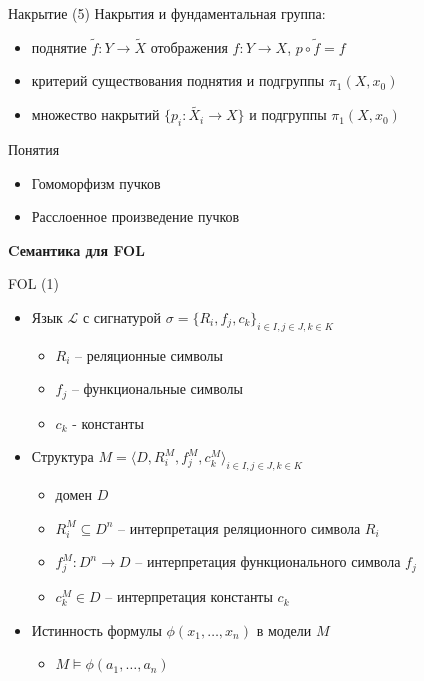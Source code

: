 \documentclass{beamer}
\begin{document}
\begin{frame}{Накрытие (5)}
Накрытия и фундаментальная группа:\\
\medskip
\begin{itemize}
	\item поднятие $\widetilde{f} : Y \to \widetilde{X}$ отображения $f : Y \to X$, $p \circ \widetilde{f} = f$ 
	\item критерий существования поднятия и подгруппы $\pi_1(X, x_0)$
	\item множество накрытий $\{ p_i : \widetilde{X_i} \to X \}$ и подгруппы $\pi_1(X, x_0)$
\end{itemize}
\end{frame}

\begin{frame}{Понятия}
\begin{itemize}
	\item Гомоморфизм пучков 
	\item Расслоенное произведение пучков
\end{itemize}
\end{frame}


\begin{frame}{}
\begin{center}
	\textbf{Cемантика для FOL}
\end{center}
\end{frame}

\begin{frame}{FOL (1)}
\begin{itemize}
	\item Язык $\mathcal{L}$ с сигнатурой $\sigma = \{ R_i, f_j, c_k \}_{i \in I, j \in J, k \in K}$
		\medskip
		\begin{itemize}
			\item $R_i$ -- реляционные символы
			\item $f_j$ -- функциональные символы
			\item $c_k$ - константы
		\end{itemize}
	\bigskip
	\item Структура $M = \langle D, R_i^M, f_j^M, c_k^M \rangle_{i \in I, j \in J, k \in K}$
		\medskip
		\begin{itemize}
			\item домен $D$ 
			\item $R_i^M \subseteq D^n$ -- интерпретация реляционного символа $R_i$
			\item $f_j^M : D^n \to D$ -- интерпретация функционального символа $f_j$
			\item $c_k^M \in D$ -- интерпретация константы $c_k$
		\end{itemize}
	\bigskip
	\item Истинность формулы $\phi(x_1, \dots, x_n)$ в модели $M$
		\medskip
		\begin{itemize}
			\item $M \models \phi(a_1, \dots, a_n)$
		\end{itemize}
\end{itemize}
\end{frame}
\end{document}
